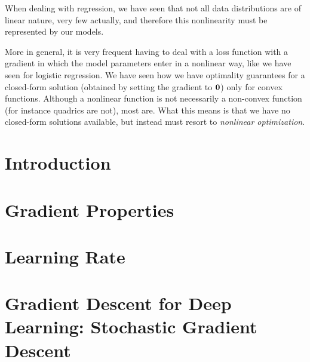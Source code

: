 
When dealing with regression, we have seen that not all data distributions are of linear nature, very few actually, and therefore this nonlinearity must be represented by our models. 

More in general, it is very frequent having to deal with a loss function with a gradient in which the model parameters enter in a nonlinear way, like we have seen for logistic regression. We have seen how we have optimality guarantees for a closed-form solution (obtained by setting the gradient to $\vb{0}$) only for convex functions. Although a nonlinear function is not necessarily a non-convex function (for instance quadrics are not), most are. What this means is that we have no closed-form solutions available, but instead must resort to \emph{nonlinear optimization}. 

\section{Introduction} 


\section{Gradient Properties} 


\section{Learning Rate} 


\section{Gradient Descent for Deep Learning: Stochastic Gradient Descent} 

